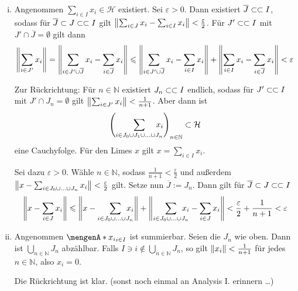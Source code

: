 \begin{enumerate}[(i)]
	\item Angenommen $\sum_{i\in I} x_i \in \mathcal{H}$ existiert. Sei $\varepsilon>0$. Dann existiert $\overline{J}\finSub I$, sodass für $\overline{J}\subset J\finSub I$ 
	gilt $\norm{\sum_{i \in J} x_i - \sum_{i \in I} x_i} < \frac{\varepsilon}{2}$. Für $J' \finSub I$ mit $J' \cap \overline{J}=\emptyset$ gilt dann
	\begin{align*}
		\norm{\sum_{i \in J'} x_i} = \norm{\sum_{i \in J' \cup \overline{J}} x_i - \sum_{i \in \overline{J}} x_i}  \le \norm{\sum_{i \in J' \cup \overline{J}}x_i - \sum_{i \in I} x_i} + \norm{\sum_{i \in I} x_i - \sum_{i \in \overline{J}}x_i}< \varepsilon  
	\end{align*}
	
	Zur Rückrichtung: Für $n \in \mathds{N}$ existiert $J_n \finSub I$ endlich, sodass für $J' \finSub I$ mit $J' \cap J_n = \emptyset$ gilt 
	$\norm{\sum_{i \in J'} x_i}< \frac{1}{n+1}$. Aber dann ist 
	\begin{align*}
		\enbrace*{\sum_{i \in J_0 \cup J_1 \cup \ldots \cup J_n} \hspace{-1em} x_i}_{n \in \mathds{N}} \subset \mathcal{H}
	\end{align*}
	eine Cauchyfolge. Für den Limes $x$ gilt $x= \sum_{i \in I} x_i$.
	
	Sei dazu $\varepsilon>0$. Wähle $n \in \mathds{N}$, sodass $\frac{1}{n+1}<\frac{\varepsilon}{2}$ und außerdem 
	$\norm{x - \sum_{i \in J_0 \cup \ldots \cup J_n} x_i}< \frac{\varepsilon}{2}$ gilt. Setze nun $\overline{J}:= J_n$. Dann gilt für 
	$\overline{J} \subset J \finSub I$
	\[
		\norm{x - \sum_{i \in J}x_i} \le \norm{x- \sum_{i \in J_0 \cup \ldots \cup J_n} \hspace{-1em} x_i } 
		+ \norm{\sum_{i \in J_0 \cup \ldots \cup J_n}\hspace{-1em} x_i - \sum_{i \in J} x_i}
		< \frac{\varepsilon}{2} + \frac{1}{n+1} < \varepsilon  
	\]
	\item Angenommen $\set{x_i}_{i \in I}$ ist summierbar. Seien die $J_n$ wie oben. Dann ist $\bigcup_{n \in \mathds{N}} J_n$ abzählbar. Falls 
	$I \ni i \not\in \bigcup_{n \in \mathds{N}} J_n$, so gilt $\norm{x_i} < \frac{1}{n+1}$ für jedes $n \in \mathds{N}$, also $x_i=0$.
	
	Die Rückrichtung ist klar. (sonst noch einmal an Analysis I. erinnern \ldots ) \bewende
\end{enumerate}

